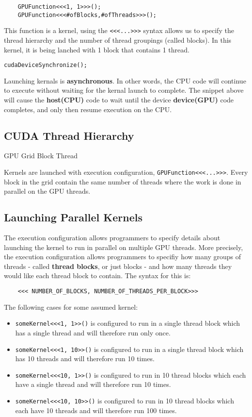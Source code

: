 \documentclass{article}
\begin{document}
\begin{verbatim}
    GPUFunction<<<1, 1>>>();
    GPUFunction<<<#ofBlocks,#ofThreads>>>();
\end{verbatim}
This function is a kernel, using the \verb_<<<...>>>_ syntax allows us to specify the thread hierarchy and the number of thread groupings (called blocks). In this kernel, it is being lanched with 1 block that contains 1 thread.

\begin{verbatim}
cudaDeviceSynchronize();
\end{verbatim}
\noindent Launching kernals is \textbf{asynchronous}. In other words, the CPU code will continue to execute without waiting for the kernal launch to complete. The snippet above will cause the \textbf{host(CPU)} code to wait until the device \textbf{device(GPU)} code completes, and only then resume execution on the CPU.

\subsection{CUDA Thread Hierarchy} 

GPU \rightarrow Grid \rightarrow Block \rightarrow Thread

Kernels are launched with execution configuration, \verb_GPUFunction<<<...>>>_. Every block in the grid contain the same number of threads where the work is done in parallel on the GPU threads. 


\subsection{Launching Parallel Kernels}

The execution configuration allows programmers to specify details about launching the kernel to run in parallel on multiple GPU threads. More precisely, the execution configuration allows programmers to specifiy how many groups of threads - called \textbf{thread blocks}, or just blocks - and how many threads they would like each thread block to contain. The syntax for this is:

\begin{verbatim}
    <<< NUMBER_OF_BLOCKS, NUMBER_OF_THREADS_PER_BLOCK>>>
\end{verbatim}

The following cases for some assumed kernel:

\begin{itemize}
	\item \verb_someKernel<<<1, 1>>()_ is configured to run in a single thread block which has a single thread and will therefore run only once. 
	\item \verb_someKernel<<<1, 10>>()_ is configured to run in a single thread block which has 10 threads and will therefore run 10 times.
	\item \verb_someKernel<<<10, 1>>()_ is configured to run in 10 thread blocks which each have a single thread and will therefore run 10 times. 
	\item \verb_someKernel<<<10, 10>>()_ is configured to run in 10 thread blocks which each have 10 threads and will therefore run 100 times.

\end{itemize}
\end{document}
